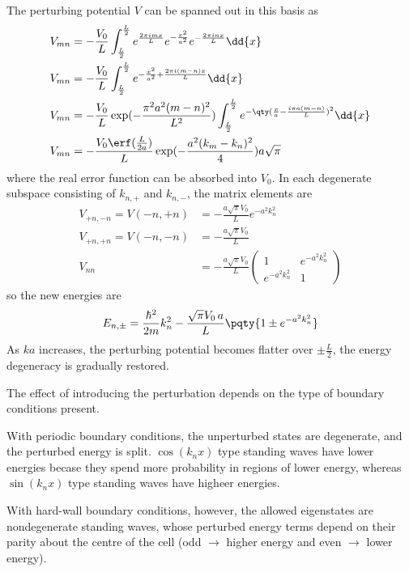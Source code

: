 \documentclass[12pt]{article}
\begin{document}
        The perturbing potential \(V\) can be spanned out in this basis as \begin{align*}
            V_{mn} &=  -\frac{V_0}{L}\int_{ \frac{L}{2}}^{\frac{L}{2}} e^{ \frac{2\pi i mx}{L}}  e^{ - \frac{x^2}{a^2}} e^{ - \frac{2\pi i nx}{L}}\dd{x}\\
            V_{mn} &=  -\frac{V_0}{L}\int_{ \frac{L}{2}}^{\frac{L}{2}}  e^{ - \frac{x^2}{a^2} + \frac{ 2\pi i (m - n) x}{L}}\dd{x}\\
            V_{mn} &=  -\frac{V_0}{L}\exp( -\frac{\pi^2a^2(m - n)^2}{L^2})\int_{ \frac{L}{2}}^{\frac{L}{2}}  e^{ - \qty(\frac{x}{a} - \frac{i \pi a(m - n) }{L})^2}\dd{x}\\
            V_{mn} & =   -\frac{V_0 \erf(\frac{L}{2a})}{L}\exp( -\frac{a^2(k_m - k_n)^2}{4})a \sqrt{\pi}
        \end{align*}
        where the real error function can be absorbed into \(V_0\). In each degenerate subspace consisting of \(k_{n, +}\) and \(k_{n, -}\), the matrix elements are 
        \begin{align*}
            V_{ +n, -n} = V( - n, + n) &=  - \frac{a \sqrt{\pi}V_0}{L}e^{ - a^2k_n^2}\\
            V_{ +n, +n} = V( - n, - n) &=  - \frac{a \sqrt{\pi}V_0}{L}
            \\ V_{nn} &=  - \frac{a \sqrt{\pi}V_0}{L}\begin{pmatrix} 1&e^{ - a^2k_n^2}\\ e^{ - a^2k_n^2}&1 \end{pmatrix} 
        \end{align*}
        so the new energies are 
        \[
            E_{n,\pm} =\frac{\hbar^2}{2m}k_n^2 - \frac{\sqrt{\pi}V_0\, a}{L}\pqty{1\pm e^{ - a^2k_n^2}}
        \]
        As \(ka\) increases, the perturbing potential becomes flatter over \(\pm \frac{L}{2}\), the energy degeneracy is gradually restored.

        
        The effect of introducing the perturbation depends on the type of boundary conditions present. 
        
        With periodic boundary conditions, the unperturbed states are degenerate, and the perturbed energy is split. \(\cos(k_nx)\) type standing waves have lower energies becase they spend more probability in regions of lower energy, whereas \(\sin(k_nx)\) type standing waves have higheer energies.

        With hard-wall boundary conditions, however, the allowed eigenstates are nondegenerate standing waves, whose perturbed energy terms depend on their parity about the centre of the cell (odd \( \to \) higher energy and even \( \to \) lower energy).
        \begin{center}
            \def\svgwidth{250pt}
        \end{center}
\end{document}
